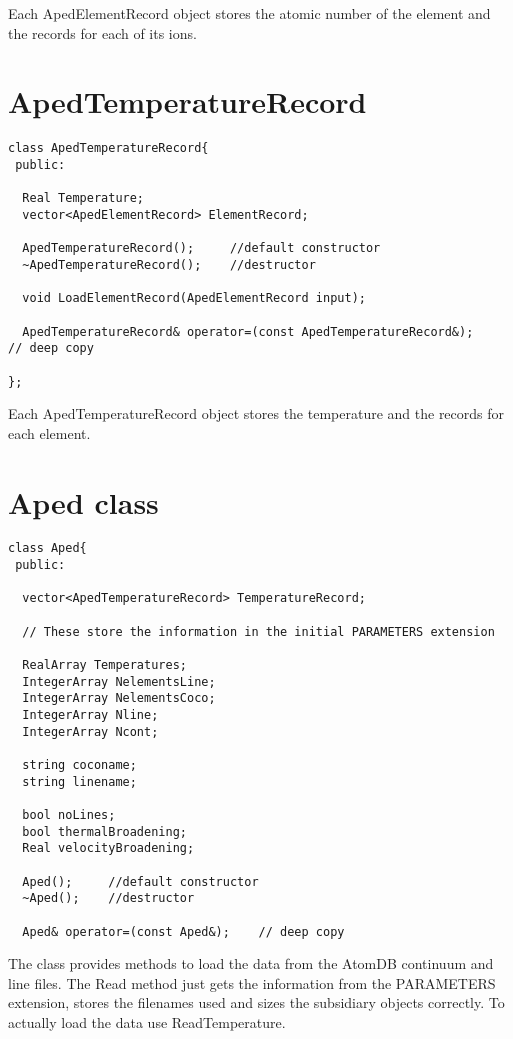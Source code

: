 \documentclass[11pt]{book}
\begin{document}
Each ApedElementRecord object stores the atomic number of the element
and the records for each of its ions.

\section{ApedTemperatureRecord}

\begin{verbatim}
class ApedTemperatureRecord{
 public:

  Real Temperature;
  vector<ApedElementRecord> ElementRecord;

  ApedTemperatureRecord();     //default constructor
  ~ApedTemperatureRecord();    //destructor

  void LoadElementRecord(ApedElementRecord input);

  ApedTemperatureRecord& operator=(const ApedTemperatureRecord&);    // deep copy

};
\end{verbatim}

Each ApedTemperatureRecord object stores the temperature and the
records for each element.

\section{Aped class}

\begin{verbatim}
class Aped{
 public:

  vector<ApedTemperatureRecord> TemperatureRecord;

  // These store the information in the initial PARAMETERS extension

  RealArray Temperatures;
  IntegerArray NelementsLine;
  IntegerArray NelementsCoco;
  IntegerArray Nline;
  IntegerArray Ncont;

  string coconame;
  string linename;

  bool noLines;
  bool thermalBroadening;
  Real velocityBroadening;

  Aped();     //default constructor
  ~Aped();    //destructor

  Aped& operator=(const Aped&);    // deep copy
\end{verbatim}

The class provides methods to load the data from the
AtomDB continuum and line files. The Read method just gets
the information from the PARAMETERS extension, stores the filenames
used and sizes the subsidiary objects correctly. To actually load the 
data use ReadTemperature. 
\end{document}
